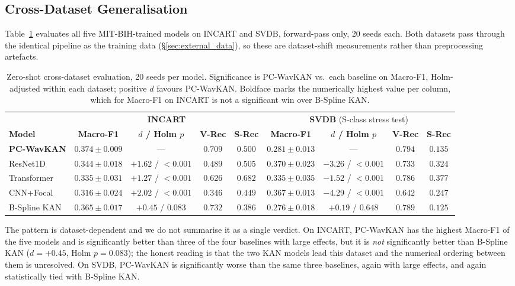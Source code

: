 \documentclass[journal,twoside,web]{ieeecolor}
\begin{document}
\subsection{Cross-Dataset Generalisation}
\label{sec:results_crossdata}
Table~\ref{tab:multidataset} evaluates all five MIT-BIH-trained models on INCART and SVDB, forward-pass only, 20 seeds each. Both datasets pass through the identical pipeline as the training data (\S\ref{sec:external_data}), so these are dataset-shift measurements rather than preprocessing artefacts.

\begin{table}[!t]
\centering
\caption{Zero-shot cross-dataset evaluation, 20 seeds per model. Significance is PC-WavKAN vs.\ each baseline on Macro-F1, Holm-adjusted within each dataset; positive $d$ favours PC-WavKAN. Boldface marks the numerically highest value per column, which for Macro-F1 on INCART is not a significant win over B-Spline KAN.}
\label{tab:multidataset}
\footnotesize
\begin{tabular}{l c c c c c c c c}
\toprule
& \multicolumn{4}{c}{\textbf{INCART}} & \multicolumn{4}{c}{\textbf{SVDB} (S-class stress test)} \\
\cmidrule(lr){2-5}\cmidrule(lr){6-9}
\textbf{Model} & \textbf{Macro-F1} & \textbf{$d$ / Holm $p$} & \textbf{V-Rec} & \textbf{S-Rec} & \textbf{Macro-F1} & \textbf{$d$ / Holm $p$} & \textbf{V-Rec} & \textbf{S-Rec} \\ \midrule
\textbf{PC-WavKAN} & $\mathbf{0.374\pm0.009}$ & --- & $0.709$ & $0.500$ & $0.281\pm0.013$ & --- & $\mathbf{0.794}$ & $0.135$ \\
ResNet1D & $0.344\pm0.018$ & $+1.62$ / $<0.001$ & $0.489$ & $0.505$ & $\mathbf{0.370\pm0.023}$ & $-3.26$ / $<0.001$ & $0.733$ & $0.324$ \\
Transformer & $0.335\pm0.031$ & $+1.27$ / $<0.001$ & $0.626$ & $\mathbf{0.682}$ & $0.335\pm0.035$ & $-1.52$ / $<0.001$ & $0.786$ & $\mathbf{0.377}$ \\
CNN+Focal & $0.316\pm0.024$ & $+2.02$ / $<0.001$ & $0.346$ & $0.449$ & $0.367\pm0.013$ & $-4.29$ / $<0.001$ & $0.642$ & $0.247$ \\
B-Spline KAN & $0.365\pm0.017$ & $+0.45$ / $0.083$ & $\mathbf{0.732}$ & $0.386$ & $0.276\pm0.018$ & $+0.19$ / $0.648$ & $0.789$ & $0.125$ \\ \bottomrule
\end{tabular}
\end{table}

The pattern is dataset-dependent and we do not summarise it as a single verdict. On INCART, PC-WavKAN has the highest Macro-F1 of the five models and is significantly better than three of the four baselines with large effects, but it is \emph{not} significantly better than B-Spline KAN ($d=+0.45$, Holm $p=0.083$); the honest reading is that the two KAN models lead this dataset and the numerical ordering between them is unresolved. On SVDB, PC-WavKAN is significantly worse than the same three baselines, again with large effects, and again statistically tied with B-Spline KAN.
\end{document}
